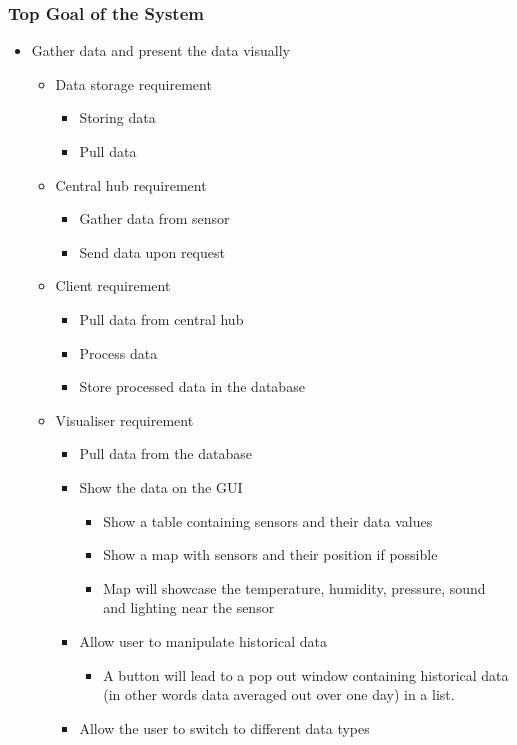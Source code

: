\documentclass[../document]{subfiles}
\begin{document}
\subsubsection{Top Goal of the System}
\begin{itemize}
	\item
	Gather data and present the data visually
	\begin{itemize}
		\item
		Data storage requirement
		\begin{itemize}
			\item
			Storing data
			\item
			Pull data
		\end{itemize}
		\item
		Central hub requirement
		\begin{itemize}
			\item
			Gather data from sensor
			\item
			Send data upon request
		\end{itemize}
		\item
		Client requirement
		\begin{itemize}
			\item
			Pull data from central hub
			\item
			Process data
			\item
			Store processed data in the database
		\end{itemize}
		\item
		Visualiser requirement
		\begin{itemize}
			\item
			Pull data from the database
			\item
			Show the data on the GUI
			\begin{itemize}
				\item
				Show a table containing sensors and their data values
				\item
				Show a map with sensors and their position if possible
				\item
				Map will showcase the temperature, humidity, pressure, sound and lighting near the sensor
			\end{itemize}
			\item
			Allow user to manipulate historical data
			\begin{itemize}
				\item
				A button will lead to a pop out window containing historical data (in other words data averaged out over one day) in a list.
			\end{itemize}
			\item
			Allow the user to switch to different data types
		\end{itemize}
	\end{itemize}
\end{itemize}
\end{document}
